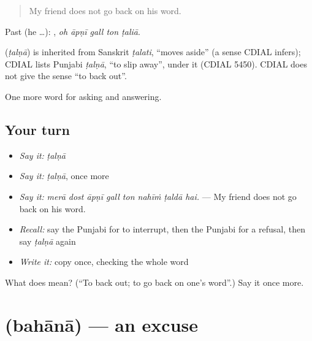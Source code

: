 \begin{quote}
My friend does not go back on his word.
\end{quote}

Past (he …):     , \emph{oh āpṇī gall ton ṭaliā}.

\begin{cousinweb}
\textbf{} (\emph{ṭalṇā}) is inherited from Sanskrit \emph{ṭalati}, \textquotedblleft{}moves aside\textquotedblright{} (a sense CDIAL infers); CDIAL lists Punjabi \emph{ṭalṇā}, \textquotedblleft{}to slip away\textquotedblright{}, under it (CDIAL 5450). CDIAL does not give the sense \textquotedblleft{}to back out\textquotedblright{}.
\end{cousinweb}

\begin{grammarlens}[title={What you've built}]
One more word for asking and answering.
\end{grammarlens}

\subsection*{Your turn}
\begin{itemize}
\raggedright
  \item \emph{Say it:} \emph{ṭalṇā}
  \item \emph{Say it:} \emph{ṭalṇā}, once more
  \item \emph{Say it:} \emph{merā dost āpṇī gall ton nahīṁ ṭaldā hai.} — My friend does not go back on his word.
  \item \emph{Recall:} say the Punjabi for to interrupt, then the Punjabi for a refusal, then say \emph{ṭalṇā} again
  \item \emph{Write it:} copy \textbf{} once, checking the whole word
\end{itemize}

\begin{tcolorbox}[breakable,colback=teal!4,colframe=teal!35!black,title={Before you move on}]
What does  mean? (\textquotedblleft{}To back out; to go back on one's word\textquotedblright{}.) Say it once more.
\end{tcolorbox}
\section[\texorpdfstring{\pa{ਬਹਾਨਾ} (bahānā)}{ਬਹਾਨਾ (bahānā)}]{ (bahānā) — an excuse}

\label{lesson:PA-C339-bahana}



